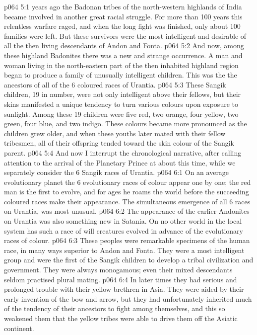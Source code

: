 \vs p064 5:1  years ago the Badonan tribes of the north\hyp{}western highlands of India became involved in another great racial struggle. For more than 100 years this relentless warfare raged, and when the long fight was finished, only about 100 families were left. But these survivors were the most intelligent and desirable of all the then living descendants of Andon and Fonta.
\vs p064 5:2 And now, among these highland Badonites there was a new and strange occurrence. A man and woman living in the north\hyp{}eastern part of the then inhabited highland region began  to produce a family of unusually intelligent children. This was the  the ancestors of all of the 6 coloured races of Urantia.
\vs p064 5:3 These Sangik children, 19 in number, were not only intelligent above their fellows, but their skins manifested a unique tendency to turn various colours upon exposure to sunlight. Among these 19 children were five red, two orange, four yellow, two green, four blue, and two indigo. These colours became more pronounced as the children grew older, and when these youths later mated with their fellow tribesmen, all of their offspring tended toward the skin colour of the Sangik parent.
\vs p064 5:4 And now I interrupt the chronological narrative, after calling attention to the arrival of the Planetary Prince at about this time, while we separately consider the 6 Sangik races of Urantia.
\vs p064 6:1 On an average evolutionary planet the 6 evolutionary races of colour appear one by one; the red man is the first to evolve, and for ages he roams the world before the succeeding coloured races make their appearance. The simultaneous emergence of all 6 races on Urantia,  was most unusual.
\vs p064 6:2 The appearance of the earlier Andonites on Urantia was also something new in Satania. On no other world in the local system has such a race of will creatures evolved in advance of the evolutionary races of colour.
\vs p064 6:3 \bibnobreakspace {} These peoples were remarkable specimens of the human race, in many ways superior to Andon and Fonta. They were a most intelligent group and were the first of the Sangik children to develop a tribal civilization and government. They were always monogamous; even their mixed descendants seldom practised plural mating.
\vs p064 6:4 In later times they had serious and prolonged trouble with their yellow brethren in Asia. They were aided by their early invention of the bow and arrow, but they had unfortunately inherited much of the tendency of their ancestors to fight among themselves, and this so weakened them that the yellow tribes were able to drive them off the Asiatic continent.
